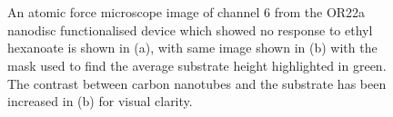 \documentclass[
  a4paper,
]{scrbook}
\begin{document}
\begin{figure}
\begin{minipage}[t]{0.03\linewidth}
{\centering 


}

\end{minipage}%
%
\begin{minipage}[t]{0.01\linewidth}

{\centering 

~

}

\end{minipage}%
%
\begin{minipage}[t]{0.38\linewidth}

{\centering 


}

\end{minipage}%
%
\begin{minipage}[t]{0.01\linewidth}

{\centering 

~

}

\end{minipage}%

\caption{\label{fig-OR22a-variability-AFM-comparison}An atomic force
microscope image of channel 6 from the OR22a nanodisc functionalised
device which showed no response to ethyl hexanoate is shown in (a), with
same image shown in (b) with the mask used to find the average substrate
height highlighted in green. The contrast between carbon nanotubes and
the substrate has been increased in (b) for visual clarity.}

\end{figure}
\end{document}
